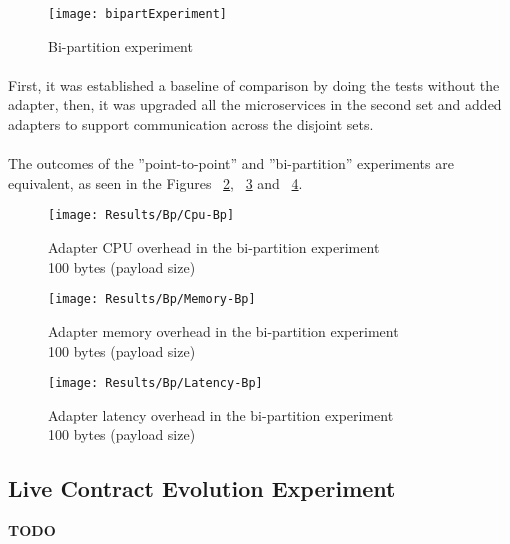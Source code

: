 \begin{figure}[htbp]
    \centering
    \texttt{[image: bipartExperiment]}
    \caption{Bi-partition experiment}
    \label{fig:biPart}
\end{figure}

\paragraph{}

First, it was established a baseline of comparison by doing the tests without the adapter,
then, it was upgraded all the microservices in the second set and added adapters to support communication across the disjoint sets.

\paragraph{}

The outcomes of the ''point-to-point'' and ''bi-partition'' experiments are equivalent, as seen in the Figures ~\ref{fig:biPartCPU}, ~\ref{fig:biPartMem} and ~\ref{fig:biPartLatency}.

\begin{figure}[htbp]
    \centering
    \texttt{[image: Results/Bp/Cpu-Bp]}
    \caption{Adapter CPU overhead in the bi-partition experiment \\\hspace{\textwidth} 100 bytes (payload size)}
    \label{fig:biPartCPU}
\end{figure}

\begin{figure}[htbp]
    \centering
    \texttt{[image: Results/Bp/Memory-Bp]}
    \caption{Adapter memory overhead in the bi-partition experiment \\\hspace{\textwidth} 100 bytes (payload size)}
    \label{fig:biPartMem}
\end{figure}

\begin{figure}[htbp]
    \centering
    \texttt{[image: Results/Bp/Latency-Bp]}
    \caption{Adapter latency overhead in the bi-partition experiment \\\hspace{\textwidth} 100 bytes (payload size)}
    \label{fig:biPartLatency}
\end{figure}

\subsection{Live Contract Evolution Experiment}

\textbf{TODO}